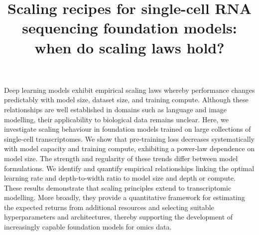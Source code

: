 \documentclass[pdflatex,sn-nature]{sn-jnl}%
\theoremstyle{thmstyleone}%
\theoremstyle{thmstyletwo}%
\theoremstyle{thmstylethree}%
\begin{document}
\title[Scaling recipes for single-cell models]{Scaling recipes for single-cell RNA sequencing foundation models: when do scaling laws hold?}


\author*[1,2]{ }

\author[1,2]{ }


\author[1,2]{ } 

\author[2]{ } 


\author[1,2]{ }
\author*[1,2]{ }





\abstract
{
Deep learning models exhibit empirical scaling laws whereby performance changes predictably with model size, dataset size, and training compute.
Although these relationships are well established in domains such as language and image modelling, their applicability to biological data remains unclear.
Here, we investigate scaling behaviour in foundation models trained on large collections of single-cell transcriptomes. 
We show that pre-training loss decreases systematically with model capacity and training compute, exhibiting a power-law dependence on model size.
The strength and regularity of these trends differ between model formulations.
We identify and quantify empirical relationships linking the optimal learning rate and depth-to-width ratio to model size and depth or compute.
These results demonstrate that scaling principles extend to transcriptomic modelling.
More broadly, they provide a quantitative framework for estimating the expected returns from additional resources and selecting suitable hyperparameters and architectures, thereby supporting the development of increasingly capable foundation models for omics data.
}
\end{document}
